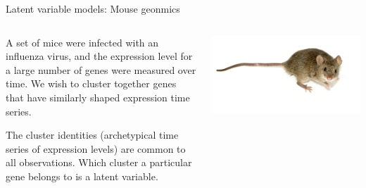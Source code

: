 \begin{frame}{Latent variable models: Mouse geonmics}

\begin{columns}
    \begin{column}{0.5\textwidth}

A set of mice were infected with an influenza virus, and the expression level
for a large number of genes were measured over time.  We wish to cluster
together genes that have similarly shaped expression time series.
\citep{Luan:2003:clustering}

\vspace{1em}

The cluster identities (archetypical time series of expression levels)
are common to all observations.  Which cluster a particular gene belongs to
is a latent variable.


    \end{column}
    \begin{column}{0.4\textwidth}
        \includegraphics[width=1.0\textwidth]{static_images/mouse.jpg}
    \end{column}
\end{columns}


\end{frame}





